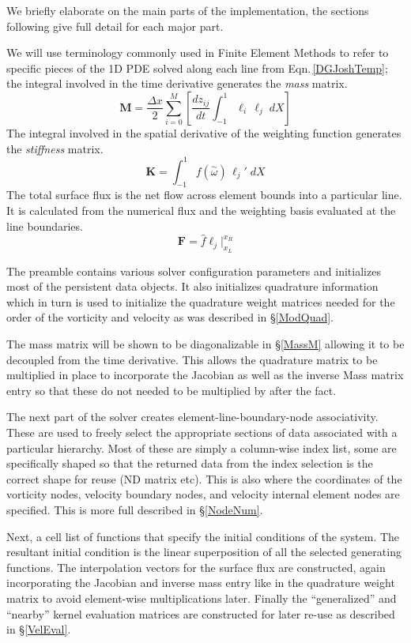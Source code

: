 \documentclass[letterpaper,12pt]{report}
\newcommand{\be}{\begin{equation}}
\newcommand{\ee}{\end{equation}}
\newcommand{\aomega}{\overset{\sim}{\omega}}				%
\begin{document}
We briefly elaborate on the main parts of the implementation, the sections following give full detail for each major part.

We will use terminology commonly used in Finite Element Methods to refer to specific pieces of the 1D PDE solved along each line from Eqn.\,\eqref{DGJoshTemp}; the integral involved in the time derivative generates the \textit{mass} matrix.
\be \boldsymbol{M} = \frac{\Delta x}{2} \sum_{i=0}^M \left[ \frac{d z_{ij}}{dt}	\int_{-1}^{1}\ell_i  \, \ell_j \;dX \right] \ee
The integral involved in the spatial derivative of the weighting function generates the \textit{stiffness} matrix.
\be \boldsymbol{K} = \int_{-1}^{1} f(\aomega) \, \ell_j' \;dX \ee
The total surface flux is the net flow across element bounds into a particular line. It is calculated from the numerical flux and the weighting basis evaluated at the line boundaries.
\be \boldsymbol{F} = \hat{f}\ell_j \Big|^{x_R}_{x_L} \ee

The preamble contains various solver configuration parameters and initializes most of the persistent data objects. It also initializes quadrature information which in turn is used to initialize the quadrature weight matrices needed for the order of the vorticity and velocity as was described in \S\ref{ModQuad}.

The mass matrix will be shown to be diagonalizable in \S\ref{MassM} allowing it to be decoupled from the time derivative. This allows the quadrature matrix to be multiplied in place to incorporate the Jacobian as well as the inverse Mass matrix entry so that these do not needed to be multiplied by after the fact. 

The next part of the solver creates element-line-boundary-node associativity. These are used to freely select the appropriate sections of data associated with a particular hierarchy. Most of these are simply a column-wise index list, some are specifically shaped so that the returned data from the index selection is the correct shape for reuse (ND matrix etc). This is also where the coordinates of the vorticity nodes, velocity boundary nodes, and velocity internal element nodes are specified. This is more full described in \S\ref{NodeNum}.

Next, a cell list of functions that specify the initial conditions of the system. The resultant initial condition is the linear superposition of all the selected generating functions. The interpolation vectors for the surface flux are constructed, again incorporating the Jacobian and inverse mass entry like in the quadrature weight matrix to avoid element-wise multiplications later. Finally the ``generalized'' and ``nearby'' kernel evaluation matrices are constructed for later re-use as described in \S\ref{VelEval}.
\end{document}
